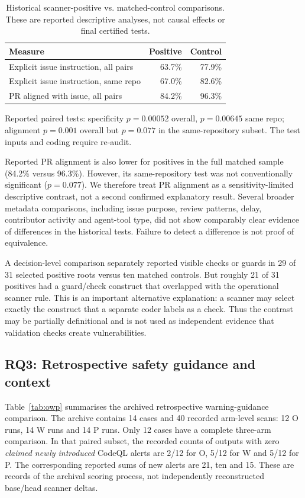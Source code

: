 \documentclass[journal,10pt,twoside]{IEEEtran}
\begin{document}
\begin{table}[t]
\centering\footnotesize
\caption{Historical scanner-positive vs. matched-control comparisons. These are reported descriptive analyses, not causal effects or final certified tests.}
\label{tab:matched}
\begin{tabularx}{\columnwidth}{@{}Xrr@{}}\toprule
\textbf{Measure} & \textbf{Positive} & \textbf{Control}\\\midrule
Explicit issue instruction, all pairs & 63.7\% & 77.9\%\\
Explicit issue instruction, same repo & 67.0\% & 82.6\%\\
PR aligned with issue, all pairs & 84.2\% & 96.3\%\\\bottomrule
\end{tabularx}
\vspace{2pt}\parbox{\columnwidth}{\scriptsize Reported paired tests: specificity $p=0.00052$ overall, $p=0.00645$ same repo; alignment $p=0.001$ overall but $p=0.077$ in the same-repository subset. The test inputs and coding require re-audit.}
\end{table}

Reported PR alignment is also lower for positives in the full matched sample (84.2\% versus 96.3\%). However, its same-repository test was not conventionally significant ($p=0.077$). We therefore treat PR alignment as a sensitivity-limited descriptive contrast, not a second confirmed explanatory result. Several broader metadata comparisons, including issue purpose, review patterns, delay, contributor activity and agent-tool type, did not show comparably clear evidence of differences in the historical tests. Failure to detect a difference is not proof of equivalence.

A decision-level comparison separately reported visible checks or guards in 29 of 31 selected positive roots versus ten matched controls. But roughly 21 of 31 positives had a guard/check construct that overlapped with the operational scanner rule. This is an important alternative explanation: a scanner may select exactly the construct that a separate coder labels as a check. Thus the contrast may be partially definitional and is not used as independent evidence that validation checks create vulnerabilities.

\subsection{RQ3: Retrospective safety guidance and context}
Table~\ref{tab:owp} summarises the archived retrospective warning-guidance comparison. The archive contains 14 cases and 40 recorded arm-level scans: 12 O runs, 14 W runs and 14 P runs. Only 12 cases have a complete three-arm comparison. In that paired subset, the recorded counts of outputs with zero \emph{claimed newly introduced} CodeQL alerts are 2/12 for O, 5/12 for W and 5/12 for P. The corresponding reported sums of new alerts are 21, ten and 15. These are records of the archival scoring process, not independently reconstructed base/head scanner deltas.
\end{document}
